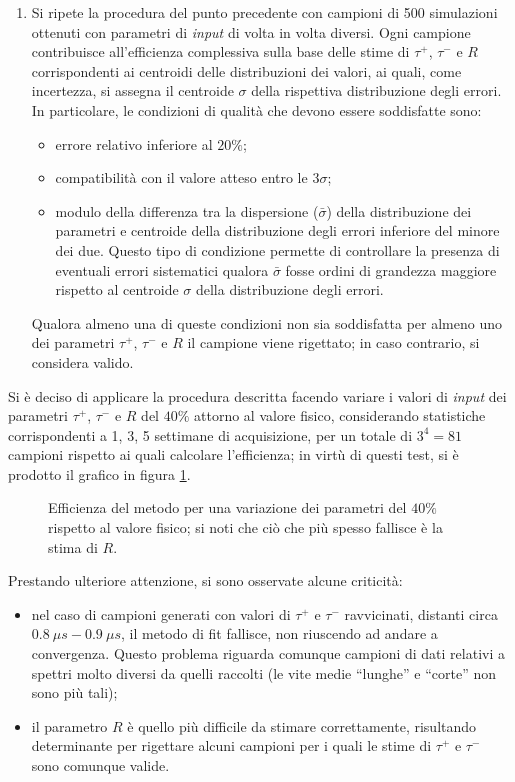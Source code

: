 \documentclass[10pt, oneside, a4paper]{article}   	%
\begin{document}
\begin{enumerate}
 \item Si ripete la procedura del punto precedente con campioni di 500 simulazioni ottenuti con parametri di \textit{input} di volta in volta diversi. Ogni campione contribuisce all'efficienza complessiva sulla base delle stime di $\tau^+$, $\tau^-$ e $R$ corrispondenti ai centroidi delle distribuzioni dei valori, ai quali, come incertezza, si assegna il centroide $\sigma$ della rispettiva distribuzione degli errori. In particolare, le condizioni di qualità che devono essere soddisfatte sono:  
 \begin{itemize}
  \item errore relativo inferiore al $20\%$;
  \item compatibilità con il valore atteso entro le $3\sigma$;
  \item modulo della differenza tra la dispersione ($\bar{\sigma}$) della distribuzione dei parametri e centroide della distribuzione degli errori inferiore del minore dei due. Questo tipo di condizione permette di controllare la presenza di eventuali errori sistematici qualora $\bar{\sigma}$ fosse ordini di grandezza maggiore rispetto al centroide $\sigma$ della distribuzione degli errori.  
 \end{itemize}
Qualora almeno una di queste condizioni non sia soddisfatta per almeno uno dei parametri $\tau^+$, $\tau^-$ e $R$ il campione viene rigettato; in caso contrario, si considera valido. 
\end{enumerate}
Si è deciso di applicare la procedura descritta facendo variare i valori di \textit{input} dei parametri $\tau^+$, $\tau^-$ e $R$ del $40\%$ attorno al valore fisico, considerando statistiche corrispondenti a 1, 3, 5 settimane di acquisizione, per un totale di $3^4=81$ campioni rispetto ai quali calcolare l'efficienza; in virtù di questi test, si è prodotto il grafico in figura \ref{fig:eff1}.
%
\begin{figure}[b!]
  \centering
  
  \caption{Efficienza del metodo per una variazione dei parametri del $40\%$ rispetto al valore fisico; si noti che ciò che più spesso fallisce è la stima di $R$.}
  \label{fig:eff1}
\end{figure}
%
Prestando ulteriore attenzione, si sono osservate alcune criticità:
\begin{itemize}
 \item nel caso di campioni generati con valori di $\tau^+$ e $\tau^-$ ravvicinati, distanti circa $0.8 \ \mu s - 0.9 \ \mu s$, il metodo di fit fallisce, non riuscendo ad andare a convergenza. Questo problema riguarda comunque campioni di dati relativi a spettri molto diversi da quelli raccolti (le vite medie ``lunghe'' e ``corte'' non sono più tali);
 \item il parametro $R$ è quello più difficile da stimare correttamente, risultando determinante per rigettare alcuni campioni per i quali le stime di $\tau^+$ e $\tau^-$ sono comunque valide.  
\end{itemize}
\end{document}
